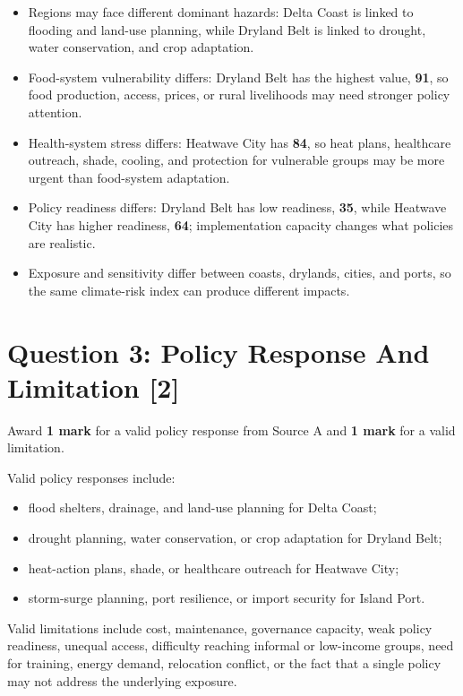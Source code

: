\documentclass[11pt,a4paper]{article}
\newcommand{\term}[1]{\textcolor{HeadingBlue}{\textbf{#1}}}
\newcommand{\score}[1]{\textcolor{AccentTeal}{\textbf{#1}}}
\begin{document}
\begin{itemize}
  \item Regions may face different dominant hazards: Delta Coast is linked to
  flooding and land-use planning, while Dryland Belt is linked to drought,
  water conservation, and crop adaptation.
  \item Food-system vulnerability differs: Dryland Belt has the highest value,
  \term{91}, so food production, access, prices, or rural livelihoods may need
  stronger policy attention.
  \item Health-system stress differs: Heatwave City has \term{84}, so heat
  plans, healthcare outreach, shade, cooling, and protection for vulnerable
  groups may be more urgent than food-system adaptation.
  \item Policy readiness differs: Dryland Belt has low readiness, \term{35},
  while Heatwave City has higher readiness, \term{64}; implementation capacity
  changes what policies are realistic.
  \item Exposure and sensitivity differ between coasts, drylands, cities, and
  ports, so the same climate-risk index can produce different impacts.
\end{itemize}

\section{Question 3: Policy Response And Limitation [2]}

Award \score{1 mark} for a valid policy response from Source A and
\score{1 mark} for a valid limitation.

Valid policy responses include:

\begin{itemize}
  \item flood shelters, drainage, and land-use planning for Delta Coast;
  \item drought planning, water conservation, or crop adaptation for Dryland
  Belt;
  \item heat-action plans, shade, or healthcare outreach for Heatwave City;
  \item storm-surge planning, port resilience, or import security for Island
  Port.
\end{itemize}

Valid limitations include cost, maintenance, governance capacity, weak policy
readiness, unequal access, difficulty reaching informal or low-income groups,
need for training, energy demand, relocation conflict, or the fact that a
single policy may not address the underlying exposure.
\end{document}
